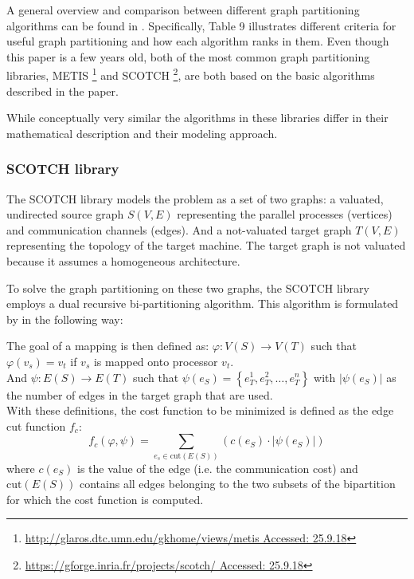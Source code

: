 A general overview and comparison between different graph partitioning algorithms can be found in \citet{karypis1998fast}.
Specifically, Table 9 illustrates different criteria for useful graph partitioning and how each algorithm ranks in them.
Even though this paper is a few years old, both of the most common graph partitioning libraries, METIS \footnote{\href{http://glaros.dtc.umn.edu/gkhome/views/metis}{http://glaros.dtc.umn.edu/gkhome/views/metis Accessed: 25.9.18}} and SCOTCH \footnote{\href{https://gforge.inria.fr/projects/scotch/}{https://gforge.inria.fr/projects/scotch/ Accessed: 25.9.18}}, are both based on the basic algorithms described in the paper.

While conceptually very similar the algorithms in these libraries differ in their mathematical description and their modeling approach.

\subsubsection{SCOTCH library}
The SCOTCH library models the problem as a set of two graphs:
a valuated, undirected source graph $S(V, E)$ representing the parallel processes (vertices) and communication channels (edges). And a not-valuated target graph $T(V, E)$ representing the topology of the target machine.
The target graph is not valuated because it assumes a homogeneous architecture.

To solve the graph partitioning on these two graphs, the SCOTCH library employs a dual recursive bi-partitioning algorithm.
This algorithm is formulated by \citet{pellegrini1994static} in the following way:

The goal of a mapping is then defined as:
$\varphi : V\left(S\right) \rightarrow V\left(T\right)$ such that $\varphi\left(v_s\right) = v_t $ if $v_s$ is mapped onto processor $v_t$.
\\
And $\psi : E\left(S\right) \rightarrow E\left(T\right)$ such that $\psi\left(e_S\right) = \left\{ e_T^1, e_T^2, \dots, e_T^n \right\}$ with $\left| \psi\left(e_S\right) \right|$ as the number of edges in the target graph that are used.
\\
With these definitions, the cost function to be minimized is defined as the edge cut function $f_c$:
\begin{equation}
f_c\left(\varphi, \psi \right) = \sum_{e_s \in \text{cut} \left(E\left(S\right)\right)} \left(c\left(e_S\right) \cdot \left| \psi\left(e_S\right) \right| \right)
\end{equation}
where $c\left(e_S\right)$ is the value of the edge (i.e. the communication cost) and $\text{cut} \left(E\left(S\right)\right)$ contains all edges belonging to the two subsets of the bipartition for which the cost function is computed.

